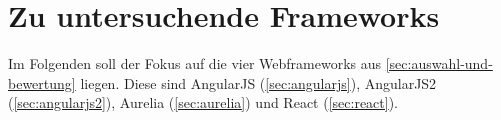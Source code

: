 \section{Zu untersuchende Frameworks}

Im Folgenden soll der Fokus auf die vier Webframeworks aus \autoref{sec:auswahl-und-bewertung} liegen. Diese sind AngularJS (\autoref{sec:angularjs}),  AngularJS2 (\autoref{sec:angularjs2}), Aurelia (\autoref{sec:aurelia}) und React (\autoref{sec:react}).
